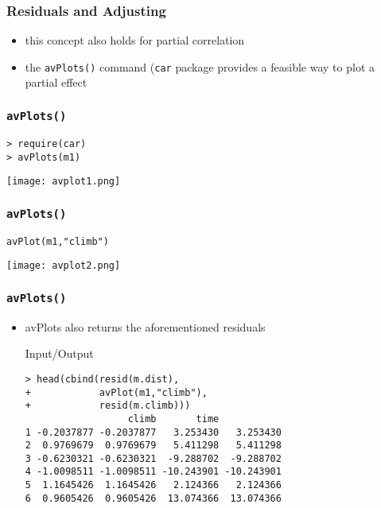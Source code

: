 \begin{frame}\frametitle{Residuals and Adjusting}
  \begin{itemize}
  \item this concept also holds for partial correlation
  \item the \texttt{avPlots()} command (\texttt{car} package provides a feasible way to plot a partial effect
  \end{itemize}
\end{frame}


\begin{frame}[fragile]\frametitle{\texttt{avPlots()}}
\begin{verbatim}
> require(car)
> avPlots(m1)
\end{verbatim}
\begin{center}
\texttt{[image: avplot1.png]}
\end{center}
\end{frame}


\begin{frame}[fragile]\frametitle{\texttt{avPlots()}}
\begin{verbatim}
avPlot(m1,"climb")
\end{verbatim}
\begin{center}
\texttt{[image: avplot2.png]}
\end{center}
\end{frame}



\begin{frame}[fragile]\frametitle{\texttt{avPlots()}}
  \begin{itemize}
  \item avPlots also returns the aforementioned residuals
    \begin{exampleblock}{Input/Output}
\begin{verbatim}
> head(cbind(resid(m.dist),
+            avPlot(m1,"climb"),
+            resid(m.climb)))
                  climb       time           
1 -0.2037877 -0.2037877   3.253430   3.253430
2  0.9769679  0.9769679   5.411298   5.411298
3 -0.6230321 -0.6230321  -9.288702  -9.288702
4 -1.0098511 -1.0098511 -10.243901 -10.243901
5  1.1645426  1.1645426   2.124366   2.124366
6  0.9605426  0.9605426  13.074366  13.074366
\end{verbatim}
    \end{exampleblock}
  \end{itemize}
\end{frame}

